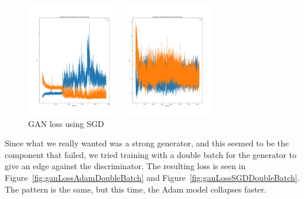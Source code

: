 \documentclass{article}
\begin{document}
\begin{figure}[ht]
    \begin{minipage}{0.45\textwidth}
        \includegraphics[width=\textwidth, height=5cm]{GAN-loss-Adam.png}
        \caption{%
            GAN loss using Adam
        }\label{fig:ganLossAdam}
    \end{minipage}
    \begin{minipage}{0.45\textwidth}
        \includegraphics[width=\textwidth, height=5cm]{GAN-loss-SGD.png}
        \caption{%
            GAN loss using SGD
        }\label{fig:ganLossSGD}
    \end{minipage}
\end{figure}

Since what we really wanted was a strong generator, and this seemed to be the
component that failed, we tried training with a double batch for the generator
to give an edge against the discriminator. The resulting loss is seen in
Figure~\ref{fig:ganLossAdamDoubleBatch} and
Figure~\ref{fig:ganLossSGDDoubleBatch}. The pattern is the same, but this time,
the Adam model collapses faster.
\end{document}
